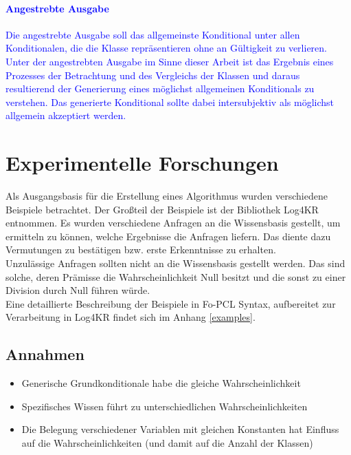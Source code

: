 \documentclass[a4paper, 11pt]{book}
\begin{document}
\textcolor{blue}{
\subsubsection{Angestrebte Ausgabe}  \label{angestrebte Ausgabe}
	 Die angestrebte Ausgabe soll das allgemeinste Konditional unter allen Konditionalen, die die Klasse repräsentieren ohne an Gültigkeit zu verlieren.
	Unter der angestrebten Ausgabe im Sinne dieser Arbeit ist das Ergebnis eines Prozesses der Betrachtung und des Vergleichs der Klassen und daraus resultierend der Generierung eines möglichst allgemeinen Konditionals zu verstehen. Das generierte Konditional sollte dabei intersubjektiv als möglichst allgemein akzeptiert werden.
}


	
\chapter{Experimentelle Forschungen} \label{Experim. Forschungen}
Als Ausgangsbasis für die Erstellung eines Algorithmus wurden verschiedene Beispiele betrachtet. Der Großteil der Beispiele ist der Bibliothek Log4KR entnommen. Es wurden verschiedene Anfragen an die Wissensbasis gestellt, um ermitteln zu können, welche Ergebnisse die Anfragen liefern. Das diente dazu Vermutungen zu bestätigen bzw. erste Erkenntnisse zu erhalten.\\
Unzulässige Anfragen sollten nicht an die Wissensbasis gestellt werden. Das sind solche, deren Prämisse die Wahrscheinlichkeit Null besitzt und die sonst zu einer Division durch Null führen würde.\\
Eine detaillierte Beschreibung der Beispiele in Fo-PCL Syntax, aufbereitet zur Verarbeitung in Log4KR findet sich im Anhang \ref{examples}.

\section{Annahmen}

\begin{itemize}
	\item Generische Grundkonditionale habe die gleiche Wahrscheinlichkeit
	\item Spezifisches Wissen führt zu unterschiedlichen Wahrscheinlichkeiten
	\item Die Belegung verschiedener Variablen mit gleichen Konstanten hat Einfluss auf die Wahrscheinlichkeiten (und damit auf die Anzahl der Klassen)
	
\end{itemize}
\end{document}
